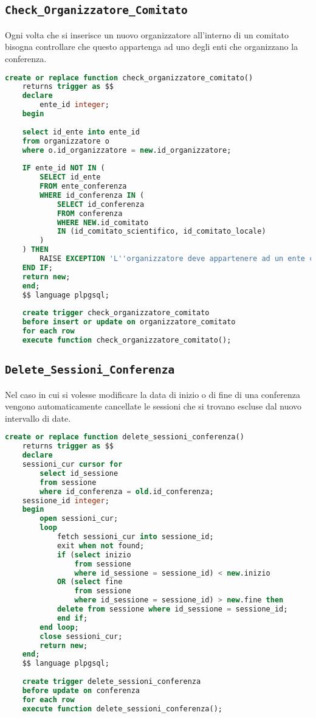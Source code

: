 \subsection{\texttt{Check\_Organizzatore\_Comitato}}
Ogni volta che si inserisce un nuovo organizzatore all'interno di un comitato bisogna controllare che questo appartenga ad uno degli enti che organizzano la conferenza.
\begin{lstlisting}[language=SQL, style=mystyle, caption={\texttt{Check\_organizzatori\_comitato}}]
	create or replace function check_organizzatore_comitato() 
	returns trigger as $$
	declare
		ente_id integer;
	begin
	
	select id_ente into ente_id
	from organizzatore o
	where o.id_organizzatore = new.id_organizzatore;
	
	IF ente_id NOT IN (
		SELECT id_ente
		FROM ente_conferenza
		WHERE id_conferenza IN (
			SELECT id_conferenza
			FROM conferenza
			WHERE NEW.id_comitato 
			IN (id_comitato_scientifico, id_comitato_locale)
		)
	) THEN
		RAISE EXCEPTION 'L''organizzatore deve appartenere ad un ente che ha organizzato la conferenza';
	END IF;
	return new;
	end;
	$$ language plpgsql;
	
	create trigger check_organizzatore_comitato
	before insert or update on organizzatore_comitato
	for each row
	execute function check_organizzatore_comitato();
\end{lstlisting}
\subsection{\texttt{Delete\_Sessioni\_Conferenza}}
Nel caso in cui si volesse modificare la data di inizio o di fine di una conferenza vengono automaticamente cancellate le sessioni che si trovano escluse dal nuovo intervallo di date.
\begin{lstlisting}[language=SQL, style=mystyle, caption={\texttt{delete\_sessioni\_conferenza}}]
	create or replace function delete_sessioni_conferenza() 
	returns trigger as $$
	declare
	sessioni_cur cursor for 
		select id_sessione 
		from sessione 
		where id_conferenza = old.id_conferenza;
	sessione_id integer;
	begin
		open sessioni_cur;
		loop
			fetch sessioni_cur into sessione_id;
			exit when not found;
			if (select inizio
				from sessione 
				where id_sessione = sessione_id) < new.inizio 
			OR (select fine 
				from sessione 
				where id_sessione = sessione_id) > new.fine then
			delete from sessione where id_sessione = sessione_id;
			end if;
		end loop;
		close sessioni_cur;
		return new;
	end;
	$$ language plpgsql;
	
	create trigger delete_sessioni_conferenza
	before update on conferenza
	for each row
	execute function delete_sessioni_conferenza();
\end{lstlisting}
